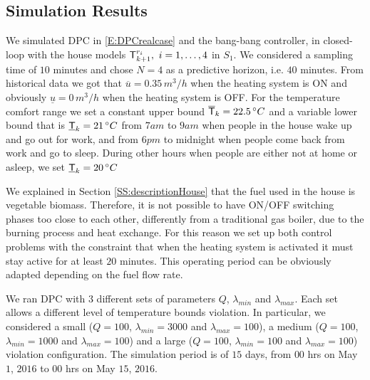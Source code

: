\subsection{Simulation Results}\label{SS:simulationResults} We simulated  DPC in \eqref{E:DPCrealcase} and the bang-bang controller, in closed-loop with the house models $\mathsf{T}^{r_i}_{k+1},\ i=1,\ldots,4$ in $S_1$. We considered a sampling time of $10$ minutes and chose $N=4$ as a predictive horizon, i.e. $40$ minutes. From historical data we got that $\overline{u} = 0.35 \, m^3/h$ when the heating system is ON and obviously $\underline{u} = 0 \, m^3/h$ when the heating system is OFF. For the temperature comfort range we set a constant upper bound $\overline{\mathsf{T}}_{k} = 22.5 \, \degree C$ and a variable lower bound that is $\underline{\mathsf{T}}_{k} = 21 \, \degree C$ from $7am$ to $9am$ when people in the house wake up and go out for work, and from $6pm$ to midnight when people come back from work and go to sleep. During other hours when people are either not at home or asleep, we set $\underline{\mathsf{T}}_{k} = 20 \, \degree C$ 

We explained in Section \ref{SS:descriptionHouse} that the fuel used in the house is vegetable biomass. Therefore, it is not possible to have ON/OFF switching phases too close to each other, differently from a traditional gas boiler, due to the burning process and heat exchange. For this reason we set up both control problems with the constraint that when the heating system is activated it must stay active for at least $20$ minutes. This operating period can be obviously adapted depending on the fuel flow rate.

We ran DPC with $3$ different sets of parameters $Q$, $\lambda_{min}$ and $\lambda_{max}$. Each set allows a different level of temperature bounds violation. In particular, we considered a small ($Q=100$, $\lambda_{min}=3000$ and $\lambda_{max}=100$), a medium ($Q=100$, $\lambda_{min}=1000$ and $\lambda_{max}=100$) and a large ($Q=100$, $\lambda_{min}=100$ and $\lambda_{max}=100$) violation configuration.
\textcolor[rgb]{0,0,1}{The simulation period is of $15$ days, from $00$ hrs on May $1$, $2016$ to $00$ hrs on May $15$, $2016$.}

